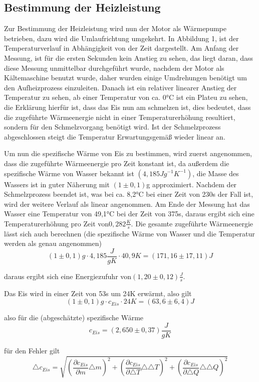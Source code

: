 \subsection{Bestimmung der Heizleistung}
Zur Bestimmung der Heizleistung wird nun der Motor als Wärmepumpe
betrieben, dazu wird die Umlaufrichtung umgekehrt. In Abbildung 1,
ist der Temperaturverlauf in Abhängigkeit von der Zeit dargestellt.
Am Anfang der Messung, ist für die ersten Sekunden kein Anstieg zu
sehen, das liegt daran, dass diese Messung unmittelbar durchgeführt
wurde, nachdem der Motor als Kältemaschine benutzt wurde, daher wurden
einige Umdrehungen benötigt um den Aufheizprozess einzuleiten. Danach
ist ein relativer linearer Anstieg der Temperatur zu sehen, ab einer
Temperatur von ca. 0°C ist ein Plateu zu sehen, die Erklärung hierfür
ist, dass das Eis nun am schmelzen ist, dies bedeutet, dass die zugeführte
Wärmeenergie nicht in einer Temperaturerhöhung resultiert, sondern
für den Schmelzvorgang benötigt wird. Ist der Schmelzprozess abgeschlossen
steigt die Temperatur Erwartungsgemäß wieder linear an.

Um nun die spezifische Wärme von Eis zu bestimmen, wird zuerst angenommen,
dass die zugeführte Wärmeenergie pro Zeit konstant ist, da außerdem
die spezifische Wärme von Wasser bekannt ist $\left(4,185Jg^{-1}K^{-1}\right)$,
die Masse des Wassers ist in guter Näherung mit $(1\pm0,1)$g approximiert.
Nachdem der Schmelzprozess beendet ist, was bei ca. 8,2°C bei einer
Zeit von 230s der Fall ist, wird der weitere Verlauf als linear angenommen.
Am Ende der Messung hat das Wasser eine Temperatur von 49,1°C bei
der Zeit von 375s, daraus ergibt sich eine Temperaturerhöhung pro
Zeit von$0,282\frac{K}{s}$. Die gesamte zugeführte Wärmeenergie lässt
sich auch berechnen (die spezifische Wärme von Wasser und die Temperatur
werden als genau angenommen)
\[
(1\pm0,1)g\cdot4,185\frac{J}{gK}\cdot40,9K=(171,16\pm17,11)J
\]


daraus ergibt sich eine Energiezufuhr von$(1,20\pm0,12)\frac{J}{s}$.

Das Eis wird in einer Zeit von 53s um 24K erwärmt, also gilt
\[
(1\pm0,1)g\cdot c_{Eis}\cdot24K=(63,6\pm6,4)J
\]


also für die (abgeschätzte) spezifische Wärme
\[
c_{Eis}=(2,650\pm0,37)\frac{J}{gK}
\]


für den Fehler gilt
\[
\triangle c_{Eis}=\sqrt{\left(\frac{\partial c_{Eis}}{\partial m}\triangle m\right)^{2}+\left(\frac{\partial c_{Eis}}{\partial\triangle T}\triangle\triangle T\right)^{2}+\left(\frac{\partial c_{Eis}}{\partial\triangle Q}\triangle\triangle Q\right)^{2}}
\]


